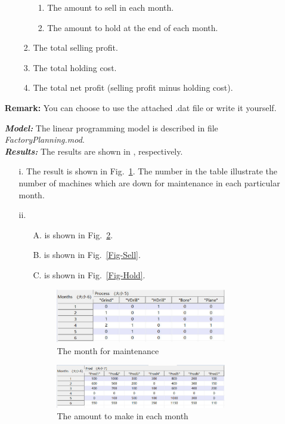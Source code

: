 \documentclass[12pt,a4paper]{article}
\theoremstyle{definition}
\begin{document}
\begin{enumerate}
\begin{enumerate}
\begin{enumerate}
\begin{enumerate}
    \item
    The amount to sell in each month.
    \item
    The amount to hold at the end of each month.
    \end{enumerate}
    \item
    The total selling profit.
    \item
    The total holding cost.
    \item
    The total net profit (selling profit minus holding cost).
    \end{enumerate}
    \end{enumerate}
    \textbf{Remark:} You can choose to use the attached .dat file or write it yourself. 
    
    \textbf{\textit{Model:}} The linear programming model is described in file \emph{FactoryPlanning.mod}.
    \\
    \textbf{\textit{Results:}} The results are shown in , respectively.
    \begin{enumerate}
        \item [i.] The result is shown in Fig.~\ref{Fig-Stop}. The number in the table illustrate the number of machines which are down for maintenance in each particular month.
        
        \item [ii.]
        \begin{enumerate}
            \item [A.] is shown in Fig.~\ref{Fig-Produce}.
            \item [B.] is shown in Fig.~\ref{Fig-Sell}.
            \item [C.] is shown in Fig.~\ref{Fig-Hold}.
            \begin{figure}[htbp]
            \centering \includegraphics[width=0.8\textwidth]{Fig-Stop.pdf}
            \caption{The month for maintenance}\label{Fig-Stop}
            \end{figure}
            \begin{figure}[htbp]
            \centering \includegraphics[width=0.8\textwidth]{Fig-Produce.pdf}
            \caption{The amount to make in each month}\label{Fig-Produce}
            \end{figure}
            

\end{enumerate}
\end{enumerate}
\end{enumerate}
\end{document}
